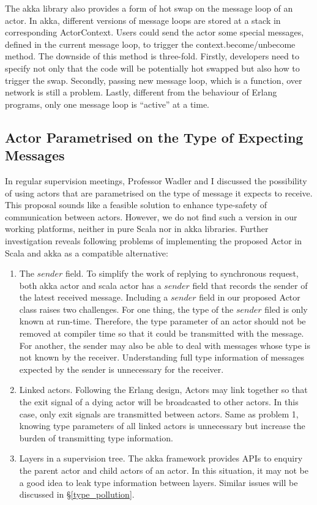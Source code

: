 The akka library \cite{akka} also provides a form of hot swap on the message loop of an actor.  In akka, different versions of message loops are stored at a stack in corresponding ActorContext.  Users could send the actor some special messages, defined in the current message loop, to trigger the context.become/unbecome method.  The downside of this method is three-fold.  Firstly, developers need to specify not only that the code will be potentially hot swapped but also how to trigger the swap.  Secondly, passing new message loop, which is a function, over network is still a problem.  Lastly, different from the behaviour of Erlang programs, only one message loop is ``active'' at a time.


\subsection{Actor Parametrised on the Type of Expecting Messages}

In regular supervision meetings, Professor Wadler and I discussed the possibility of using actors that are parametrised on the type of message it expects to receive.  This proposal sounds like a feasible solution to enhance type-safety of communication between actors.  However, we do not find such a version in our working platforms, neither in pure Scala nor in akka libraries.  Further investigation reveals following problems of implementing the proposed Actor in Scala and akka as a compatible alternative:

\begin{enumerate}
\item The $sender$ field.  To simplify the work of replying to synchronous request, both akka actor and scala actor has a $sender$ field that records the sender of the latest received message.  Including a $sender$ field in our proposed Actor class raises two challenges.  For one thing, the type of the $sender$ filed is only known at run-time.  Therefore, the type parameter of an actor should not be removed at compiler time so that it could be transmitted with the message.  For another, the sender may also be able to deal with messages whose type is not known by the receiver.  Understanding full type information of messages expected by the sender is unnecessary for the receiver.

\item Linked actors.  Following the Erlang design, Actors may link together so that the exit signal of a dying actor will be broadcasted to other actors.  In this case, only exit signals are transmitted between actors.  Same as problem 1, knowing type parameters of all linked actors is unnecessary but increase the burden of transmitting type information.

\item Layers in a supervision tree.  The akka framework provides APIs to enquiry the parent actor and child actors of an actor.  In this situation, it may not be a good idea to leak type information between layers.  Similar issues will be discussed in \S\ref{type_pollution}.
\end{enumerate}


